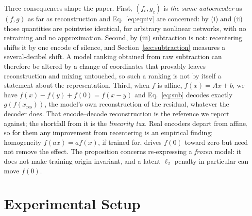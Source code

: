 \documentclass[conference]{IEEEtran}
\newcommand{\secref}[1]{Section~\ref{#1}}
\begin{document}
Three consequences shape the paper. First, $(f_c,g_c)$ is \emph{the same
autoencoder} as $(f,g)$ as far as reconstruction and Eq.~\ref{eq:equiv} are
concerned: by (i) and (ii) those quantities are pointwise identical, for
arbitrary nonlinear networks, with no retraining and no approximation.
Second, by (iii) subtraction is not: recentering shifts it by one encode of
silence, and \secref{sec:subtraction} measures a several-decibel shift. A
model ranking obtained from raw subtraction can therefore be altered by a
change of coordinates that provably leaves reconstruction and mixing
untouched, so such a ranking is not by itself a statement about the
representation. Third, when $f$ is affine, $f(x)=Ax+b$, we have
$f(x){-}f(y){+}f(0)=f(x{-}y)$ and Eq.~\ref{eq:sub} decodes exactly
$g(f(x_\mathrm{res}))$, the model's own reconstruction of the residual,
whatever the decoder does. That encode--decode reconstruction is the
reference we report against; the shortfall from it is the \emph{linearity
tax}. Real encoders depart from affine, so for them any improvement from
recentering is an empirical finding; homogeneity $f(ax)=af(x)$, if trained
for, drives $f(0)$ toward zero but need not remove the effect.
The proposition concerns re-expressing a \emph{frozen} model: it does not
make training origin-invariant, and a latent $\ell_2$ penalty in particular
can move $f(0)$.

\section{Experimental Setup}\label{sec:setup}
\end{document}

